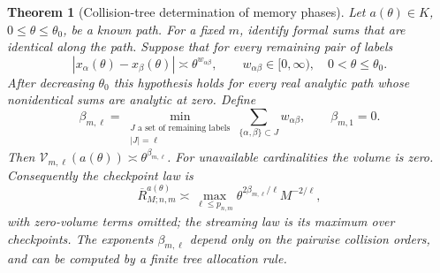 \documentclass[11pt]{amsart}
\newtheorem{theorem}{Theorem}[section]
\theoremstyle{definition}\newtheorem{definition}[theorem]{Definition}
\theoremstyle{remark}\newtheorem{remark}[theorem]{Remark}
\begin{document}
\begin{theorem}[Collision-tree determination of memory phases]\label{thm:collision-tree}
Let $a(\theta)\in K$, $0\le\theta\le\theta_0$, be a known path.
For a fixed $m$, identify formal sums that are identical along the path.
Suppose that for every remaining pair of labels
\[
 |x_\alpha(\theta)-x_\beta(\theta)|
       \asymp\theta^{w_{\alpha\beta}},\qquad
 w_{\alpha\beta}\in[0,\infty),\quad 0<\theta\le\theta_0.
\]
After decreasing $\theta_0$ this hypothesis holds for every real analytic
path whose nonidentical sums are analytic at zero. Define
\begin{equation}\label{eq:tree-energy}
 \beta_{m,\ell}=
   \min_{\substack{J\text{ a set of remaining labels}\\|J|=\ell}}
         \sum_{\{\alpha,\beta\}\subset J}w_{\alpha\beta},
 \qquad \beta_{m,1}=0.
\end{equation}
Then $\mathcal V_{m,\ell}(a(\theta))\asymp
\theta^{\beta_{m,\ell}}$. For unavailable cardinalities the volume is
zero. Consequently the checkpoint law is
\begin{equation}\label{eq:tree-law}
 \overline R_{M;n,m}^{a(\theta)}\asymp
 \max_{\ell\le p_{n,m}}
       \theta^{2\beta_{m,\ell}/\ell}M^{-2/\ell},
\end{equation}
with zero-volume terms omitted; the streaming law is its maximum over
checkpoints. The exponents $\beta_{m,\ell}$ depend only on the pairwise
collision orders, and can be computed by a finite tree allocation rule.
\end{theorem}
\end{document}
